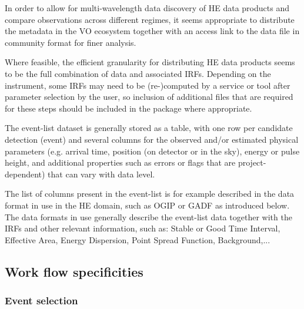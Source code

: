 \documentclass[11pt,a4paper]{ivoa}
\begin{document}
In order to allow for multi-wavelength data discovery of HE data products and compare observations across different regimes, it seems appropriate to distribute the metadata in the VO ecosystem together with an access link to the data file in community format for finer analysis.

Where feasible, the efficient granularity for distributing HE data products seems to be the full combination of data and associated IRFs. Depending on the instrument, some IRFs may need to be (re-)computed by a service or tool after parameter selection by the user, so inclusion of additional files that are required for these steps should be included in the package where appropriate.


The event-list dataset is generally stored as a table, with one row per candidate detection (event) and several columns for the observed and/or estimated physical parameters (e.g. arrival time, position (on detector or in the sky), energy or pulse height, and additional properties such as errors or flags that are project-dependent) that can vary with data level.

The list of columns present in the event-list is for example described in the data format in use in the HE domain, such as OGIP or GADF as introduced below. The data formats in use generally describe the event-list data together with the IRFs and other relevant information, such as: Stable or Good Time Interval, Effective Area, Energy Dispersion, Point Spread Function, Background,...



\subsection{Work flow specificities}

\subsubsection{Event selection}
\end{document}
